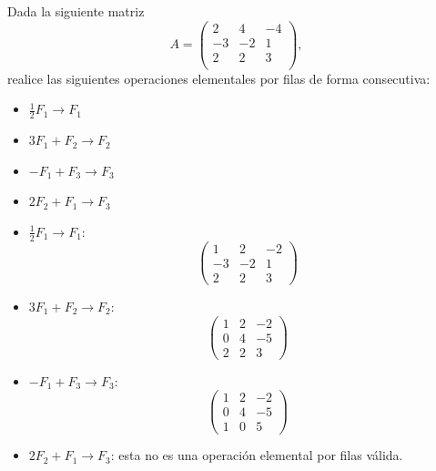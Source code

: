 \documentclass[11pt,respuestas,a4]{aleph-examen}
\begin{document}
\begin{preguntas}

\item
    Dada la siguiente matriz
    \[
        A=\begin{pmatrix}
                2 & 4 & -4 \\
                -3 & -2 & 1 \\
                2 & 2 & 3 \\
        \end{pmatrix},
    \]
    realice las siguientes operaciones elementales por filas de forma consecutiva:
    \begin{itemize}
        \item $\frac{1}{2}F_1\rightarrow F_1$ 
        \item $3F_1+F_2\rightarrow F_2$ 
        \item $-F_1+F_3\rightarrow F_3$ 
        \item $2F_2+F_1\rightarrow F_3$ 
    \end{itemize}

\begin{respuesta}
    \begin{itemize}
    \item 
        $\frac{1}{2}F_1\rightarrow F_1$:
        \[
            \begin{pmatrix}1 & 2 & -2\\-3 & -2 & 1\\2 & 2 & 3\end{pmatrix}
        \]
    \item 
        $3F_1+F_2\rightarrow F_2$:
        \[
            \begin{pmatrix}1 & 2 & -2\\0 & 4 & -5\\2 & 2 & 3\end{pmatrix}
        \]
    \item 
        $-F_1+F_3\rightarrow F_3$:
        \[
            \begin{pmatrix}1 & 2 & -2\\0 & 4 & -5\\1 & 0 & 5\end{pmatrix}
        \]
    \item
        $2F_2+F_1\rightarrow F_3$: esta no es una operación elemental por filas válida.\qedhere
    \end{itemize}
\end{respuesta}


\end{preguntas}
\end{document}
